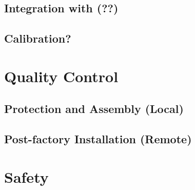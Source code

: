\subsection{Integration with (??)}
\label{sec:fdsp-slow-cryo-install-?}


\subsection{Calibration?}
\label{sec:fdsp-slow-cryo-install-calib}



\section{Quality Control}
\label{sec:fdsp-slow-cryo-qc}

\subsection{Protection and Assembly (Local)}
\label{sec:fdsp-slow-cryo-qc-local}


\subsection{Post-factory Installation (Remote)}
\label{sec:fdsp-slow-cryo-qc-remote}





\section{Safety}
\label{sec:fdsp-slow-cryo-safety}






